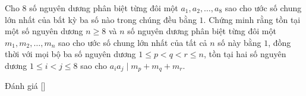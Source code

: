 \ifshowproblem
\begin{problem}\label{problem:CHN-2015-SEMO-11-P4}
    Cho $8$ số nguyên dương phân biệt từng đôi một $a_1, a_2, \ldots, a_8$
    sao cho ước số chung lớn nhất của bất kỳ ba số nào trong chúng đều bằng $1$.
    Chứng minh rằng tồn tại một số nguyên dương $n \geq 8$ và $n$ số nguyên dương phân biệt từng đôi một $m_1, m_2, \ldots, m_n$
    sao cho ước số chung lớn nhất của tất cả $n$ số này bằng $1$, đồng thời với mọi bộ ba số nguyên dương $1 \leq p < q < r \leq n$,
    tồn tại hai số nguyên dương $1 \leq i < j \leq 8$ sao cho $a_i a_j \mid m_p + m_q + m_r$.
\end{problem}
\fi

\ifshowinfo
Đánh giá [\textbf{}]\footnotemark
{}
\fi